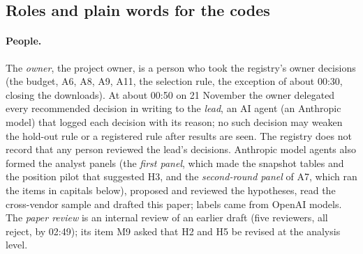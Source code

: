 \subsection{Roles and plain words for the codes}
\label{app:glossary}

\paragraph{People.} The \emph{owner}, the project owner, is a person who took the registry's owner decisions (the
budget, A6, A8, A9, A11, the selection rule, the exception of about 00:30, closing the downloads). At about 00:50 on
21 November the owner delegated every recommended decision in writing to the \emph{lead}, an AI agent (an Anthropic
model) that logged each decision with its reason; no such decision may weaken the hold-out rule or a registered rule
after results are seen. The registry does not record that any person reviewed the lead's decisions. Anthropic model
agents also formed the analyst panels (the \emph{first panel}, which made the snapshot tables and the position pilot
that suggested H3, and the \emph{second-round panel} of A7, which ran the items in capitals below), proposed and reviewed
the hypotheses, read the cross-vendor sample and drafted this paper; labels came from OpenAI models. The \emph{paper
review} is an
internal review of an earlier draft (five reviewers, all reject, by 02:49); its item M9 asked that H2 and H5 be revised
at the analysis level.

